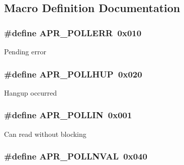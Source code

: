 \subsection{Macro Definition Documentation}
\hypertarget{group__pollopts_ga6f5a72fd9cf3f5dcf174acce0b4b77ee}{
\subsubsection[{A\-P\-R\-\_\-\-P\-O\-L\-L\-E\-R\-R}]{\setlength{\rightskip}{0pt plus 5cm}\#define A\-P\-R\-\_\-\-P\-O\-L\-L\-E\-R\-R~0x010}}\label{group__pollopts_ga6f5a72fd9cf3f5dcf174acce0b4b77ee}
Pending error \hypertarget{group__pollopts_gace76603c4fa4b56f8b5977ff1ceb6f3b}{
\subsubsection[{A\-P\-R\-\_\-\-P\-O\-L\-L\-H\-U\-P}]{\setlength{\rightskip}{0pt plus 5cm}\#define A\-P\-R\-\_\-\-P\-O\-L\-L\-H\-U\-P~0x020}}\label{group__pollopts_gace76603c4fa4b56f8b5977ff1ceb6f3b}
Hangup occurred \hypertarget{group__pollopts_ga746222e6b858bc2fc77328d59f78e788}{
\subsubsection[{A\-P\-R\-\_\-\-P\-O\-L\-L\-I\-N}]{\setlength{\rightskip}{0pt plus 5cm}\#define A\-P\-R\-\_\-\-P\-O\-L\-L\-I\-N~0x001}}\label{group__pollopts_ga746222e6b858bc2fc77328d59f78e788}
Can read without blocking \hypertarget{group__pollopts_ga132da215e207d4685fb467cc64a73f1b}{
\subsubsection[{A\-P\-R\-\_\-\-P\-O\-L\-L\-N\-V\-A\-L}]{\setlength{\rightskip}{0pt plus 5cm}\#define A\-P\-R\-\_\-\-P\-O\-L\-L\-N\-V\-A\-L~0x040}}\label{group__pollopts_ga132da215e207d4685fb467cc64a73f1b}
